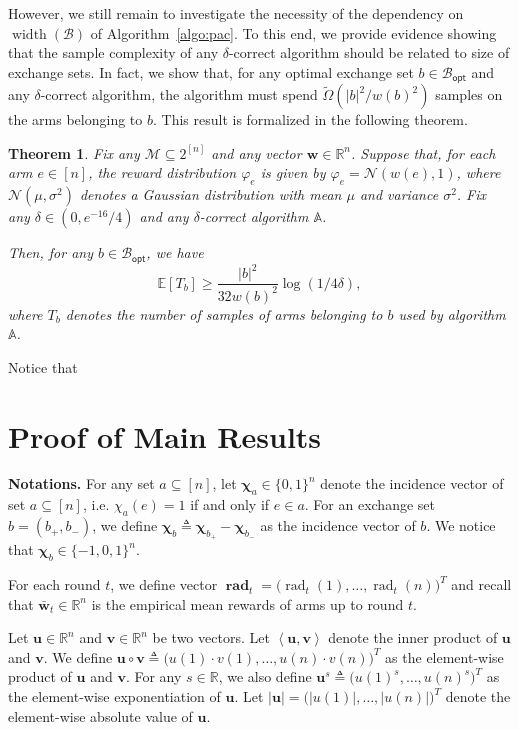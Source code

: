 \documentclass{article}
\newtheorem{theorem}{Theorem}
\newcommand{\Rew}{\varphi}
\newcommand{\E}{\mathbb E}
\newcommand{\M}{\mathcal M}
\newcommand{\B}{\mathcal B}
\newcommand{\RR}{\mathbb R}
\newcommand{\Bopt}{\mathcal B_{\mathsf{opt}}}
\DeclareMathOperator{\rank}{width}
\DeclareMathOperator{\rad}{rad}
\newcommand{\inn}[1]{\left\langle #1 \right\rangle}
\renewcommand{\vec}[1]{\boldsymbol{#1}}
\renewcommand{\odot}{\circ}
\begin{document}
\begin{spacing}{1.1}
However, we still remain to investigate the necessity of the dependency on $\rank(\B)$ of Algorithm~\ref{algo:pac}.
To this end, we provide evidence showing that the sample complexity of any $\delta$-correct algorithm should be related to size of exchange sets.
In fact, we show that, for any optimal exchange set $b\in\Bopt$ and any $\delta$-correct algorithm, the algorithm  must spend $\tilde \Omega\left(|b|^2/w(b)^2\right)$ samples on the arms belonging to $b$.
This result is formalized in the following theorem.
\begin{theorem}
Fix any $\M\subseteq 2^{[n]}$ and any vector $\vec w \in \RR^n$.
Suppose that, for each arm $e\in [n]$, the reward distribution $\Rew_e$ is given by $\Rew_e=\mathcal N(w(e),1)$, where $\mathcal N(\mu, \sigma^2)$ denotes a Gaussian distribution with mean $\mu$ and variance $\sigma^2$. 
Fix any $\delta \in (0,e^{-16}/4)$
and any $\delta$-correct algorithm $\mathbb A$.

Then, for any $b \in \Bopt$, we have
$$
\E[T_b] \ge \frac{|b|^2}{32w(b)^2}\log(1/4\delta),
$$
where $T_b$ denotes the number of samples of arms belonging to $b$ used by algorithm $\mathbb A$.
\end{theorem}
Notice that 



\section{Proof of Main Results}


\textbf{Notations.} 
For any set $a\subseteq [n]$, let $\vec \chi_a \in \{0,1\}^n$ denote the incidence vector of set $a \subseteq [n]$, i.e. $\chi_a(e) = 1$ if and only if $e\in a$.
For an exchange set $b=(b_+,b_-)$, we define $\vec \chi_b \triangleq \vec \chi_{b_+}- \vec \chi_{b_-}$ as the incidence vector of $b$.
We notice that $\vec \chi_b \in \{-1,0,1\}^n$.

For each round $t$, we define vector $\vec\rad_t = \big(\rad_t(1),\ldots,\rad_t(n)\big)^T$ and recall that $\vec {\bar w}_t\in \RR^n$ is the empirical mean rewards of arms up to round $t$.

Let $\vec u\in \RR^n$ and $\vec v\in \RR^n$ be two vectors.
Let $\inn{\vec u, \vec v}$ denote the inner product of $\vec u$ and $\vec v$.
We define $\vec u \odot \vec v \triangleq \big(u(1)\cdot v(1),\ldots,u(n)\cdot v(n)\big)^T$ as the element-wise product of $\vec u$ and $\vec v$.
For any $s\in \RR$, we also define $\vec u^s \triangleq \big(u(1)^s, \ldots, u(n)^s)^T$ as the element-wise exponentiation of $\vec u$.
Let $|\vec u| = \big(|u(1)|, \ldots, |u(n)|\big)^T$ denote the element-wise absolute value of $\vec u$.




\end{spacing}
\end{document}
